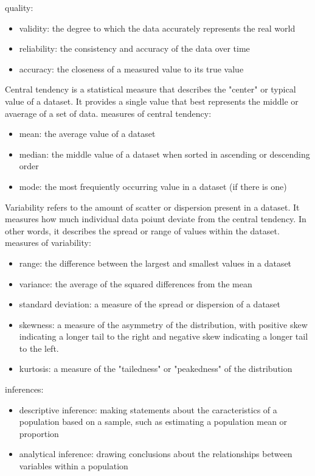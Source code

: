 \documentclass{article}
\begin{document}
quality:
	\begin{itemize}
		\item validity: the degree to which the data accurately represents the real world
		\item reliability: the consistency and accuracy of the data over time
		\item accuracy: the closeness of a measured value to its true value
	\end{itemize}

Central tendency is a statistical measure that describes the "center" or typical value of a dataset. It provides a single value that best represents the middle or avaerage of a set of data.
measures of central tendency:
	\begin{itemize}
		\item mean: the average value of a dataset
		\item median: the middle value of a dataset when sorted in ascending or descending order
		\item mode: the most frequiently occurring value in a dataset (if there is one)
	\end{itemize}

Variability refers to the amount of scatter or dispersion present in a dataset. It measures how much individual data poiunt deviate from the central tendency. In other words, it describes the spread or range of values within the dataset.
measures of variability:
	\begin{itemize}
		\item range: the difference between the largest and smallest values in a dataset
		\item variance: the average of the squared differences from the mean
		\item standard deviation: a measure of the spread or dispersion of a dataset
		\item skewness: a measure of the asymmetry of the distribution, with positive skew indicating a longer tail to the right and negative skew indicating a longer tail to the left.
		\item kurtosis: a measure of the "tailedness" or "peakedness" of the distribution
	\end{itemize}

inferences:
	\begin{itemize}
		\item descriptive inference: making statements about the caracteristics of a population based on a sample, such as estimating a population mean or proportion
		\item analytical inference: drawing conclusions about the relationships between variables within a population
	\end{itemize}
\end{document}
